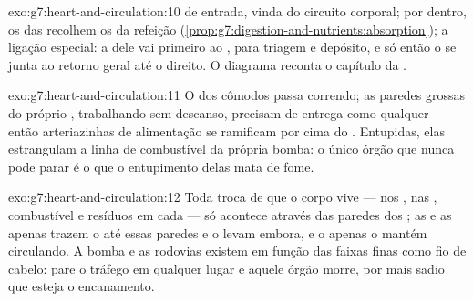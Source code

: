 \begin{solution}{exo:g7:heart-and-circulation:10}
 de entrada, vinda do circuito corporal; por dentro, os
 das  recolhem os  da refeição
(\cref{prop:g7:digestion-and-nutrients:absorption}); a ligação
especial: a  dele vai primeiro ao , para triagem e
depósito, e só então o  se junta ao retorno geral até o 
direito. O diagrama reconta o capítulo da .
\end{solution}

\begin{solution}{exo:g7:heart-and-circulation:11}
O  dos cômodos passa correndo; as paredes grossas do próprio
, trabalhando sem descanso, precisam de entrega  como
qualquer  --- então arteriazinhas de alimentação se ramificam
por cima do . Entupidas, elas estrangulam a linha de
combustível da própria bomba: o único órgão que nunca pode parar é o
que o entupimento delas mata de fome.
\end{solution}

\begin{solution}{exo:g7:heart-and-circulation:12}
Toda troca de que o corpo vive ---  nos , 
nas , combustível e resíduos em cada  --- só acontece
através das paredes dos ; as  e as  apenas
trazem o  até essas paredes e o levam embora, e o  apenas
o mantém circulando. A bomba e as rodovias existem em função das
faixas finas como fio de cabelo: pare o tráfego  em qualquer
lugar e aquele órgão morre, por mais sadio que esteja o encanamento.
\end{solution}

